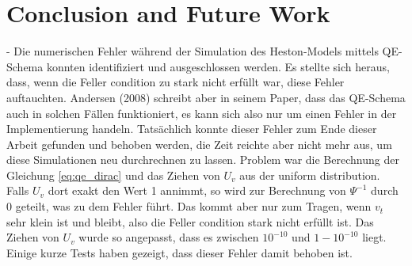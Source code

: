 \chapter{Conclusion and Future Work}
\label{sec:conclusion_future_work}

- Die numerischen Fehler während der Simulation des Heston-Models mittels QE-Schema konnten identifiziert und ausgeschlossen werden. Es stellte sich heraus, dass, wenn die Feller condition zu stark nicht erfüllt war, diese Fehler auftauchten. Andersen (2008) schreibt aber in seinem Paper, dass das QE-Schema auch in solchen Fällen funktioniert, es kann sich also nur um einen Fehler in der Implementierung handeln. Tatsächlich konnte dieser Fehler zum Ende dieser Arbeit gefunden und behoben werden, die Zeit reichte aber nicht mehr aus, um diese Simulationen neu durchrechnen zu lassen. Problem war die Berechnung der Gleichung \eqref{eq:qe_dirac} und das Ziehen von $U_v$ aus der uniform distribution. Falls $U_v$ dort exakt den Wert 1 annimmt, so wird zur Berechnung von $\Psi^{-1}$ durch 0 geteilt, was zu dem Fehler führt. Das kommt aber nur zum Tragen, wenn $v_t$ sehr klein ist und bleibt, also die Feller condition stark nicht erfüllt ist. Das Ziehen von $U_v$ wurde so angepasst, dass es zwischen $10^{-10}$ und $1-10^{-10}$ liegt. Einige kurze Tests haben gezeigt, dass dieser Fehler damit behoben ist.
